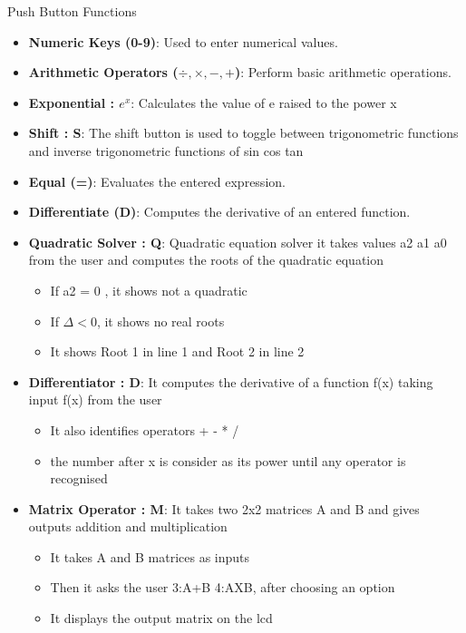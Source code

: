 \documentclass[journal]{IEEEtran}
\begin{document}
Push Button Functions 
\begin{itemize}
    \item \textbf{Numeric Keys (0-9)}: Used to enter numerical values.
    \item \textbf{Arithmetic Operators ($\div, \times, -, +$)}: Perform basic arithmetic operations.
    \item \textbf{Exponential : $e^x$}: Calculates the value of e raised to the power x 
    \item \textbf{Shift : S}: The shift button is used to toggle between trigonometric functions and inverse trigonometric functions of sin cos tan 
    \item \textbf{Equal (=)}: Evaluates the entered expression.
    \item \textbf{Differentiate (D)}: Computes the derivative of an entered function.
    \item \textbf{Quadratic Solver : Q}: Quadratic equation solver it takes values a2 a1 a0 from the user and computes the roots of the quadratic equation 
    \begin{itemize}
        \item If a2 = 0 , it shows not a quadratic 
        \item If $\Delta < 0 $, it shows no real roots 
        \item It shows Root 1 in line 1 and Root 2 in line 2 
    \end{itemize}
    \item \textbf{Differentiator : D}: It computes the derivative of a function f(x) taking input f(x) from the user 
    \begin{itemize}
        \item It also identifies operators + - * /
        \item the number after x is consider as its power until any operator is recognised 
    \end{itemize}
    \item \textbf{Matrix Operator : M}: It takes two 2x2 matrices A and B and gives outputs addition and multiplication 
    \begin{itemize}
        \item It takes A and B matrices as inputs 
        \item Then it asks the user 3:A+B 4:AXB, after choosing an option 
        \item It displays the output matrix on the lcd 
    \end{itemize}
      
    
\end{itemize}
\end{document}
